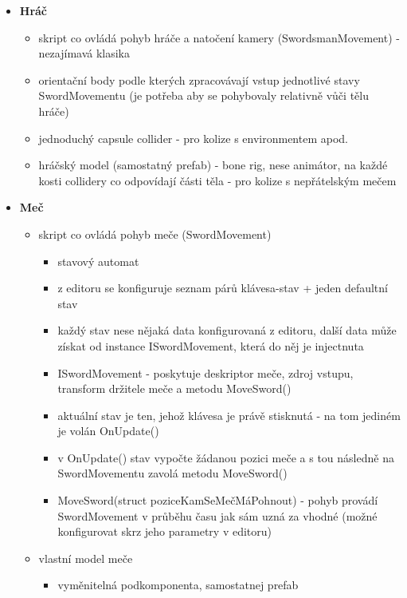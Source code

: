 \begin{itemize}
    \item \textbf{Hráč}
        \begin{itemize}
            \item skript co ovládá pohyb hráče a natočení kamery (SwordsmanMovement) - nezajímavá klasika
            \item orientační body podle kterých zpracovávají vstup jednotlivé stavy SwordMovementu (je potřeba aby se pohybovaly relativně vůči tělu hráče)
            \item jednoduchý capsule collider - pro kolize s environmentem apod.
            \item hráčský model (samostatný prefab) - bone rig, nese animátor, na každé kosti collidery co odpovídají části těla - pro kolize s nepřátelským mečem 
        \end{itemize} 
    \item \textbf{Meč} 
        \begin{itemize}
            \item skript co ovládá pohyb meče (SwordMovement)
                \begin{itemize}
                    \item stavový automat
                    \item z editoru se konfiguruje seznam párů klávesa-stav + jeden defaultní stav
                    \item každý stav nese nějaká data konfigurovaná z editoru, další data může získat od instance ISwordMovement, která do něj je injectnuta
                    \item ISwordMovement - poskytuje deskriptor meče, zdroj vstupu, transform držitele meče a metodu MoveSword()
                    \item aktuální stav je ten, jehož klávesa je právě stisknutá - na tom jediném je volán OnUpdate()
                    \item v OnUpdate() stav vypočte žádanou pozici meče a s tou následně na SwordMovementu zavolá metodu MoveSword()
                    \item MoveSword(struct poziceKamSeMečMáPohnout) - pohyb provádí SwordMovement v průběhu času jak sám uzná za vhodné (možné konfigurovat skrz jeho parametry v editoru)
                \end{itemize}
            \item vlastní model meče
                \begin{itemize}
                    \item vyměnitelná podkomponenta, samostatnej prefab

\end{itemize}
\end{itemize}
\end{itemize}
